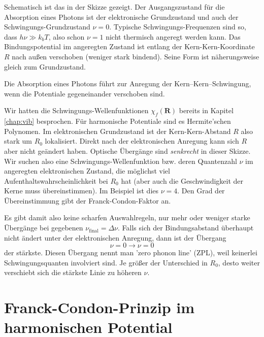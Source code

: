 Schematisch ist das in der Skizze gezeigt. Der Ausgangszustand für die Absorption eines Photons ist der elektronische Grundzustand und auch der Schwingungs-Grundzustand $\nu = 0$. Typische Schwingungs-Frequenzen sind so, dass $h \nu \gg k_b T$, also schon $\nu =1$ nicht thermisch angeregt werden kann. Das Bindungspotential im angeregten Zustand ist entlang der Kern-Kern-Koordinate $R$ nach außen verschoben (weniger stark bindend). Seine Form ist näherungsweise gleich zum Grundzustand. 

\begin{marginfigure}
\caption{Die Absorption eines Photons führt zur Anregung der Kern--Kern--Schwingung, wenn die Potentiale gegeneinander verschoben sind.}
\end{marginfigure}

Wir hatten die Schwingungs-Wellenfunktionen $\chi_f(\mathbf{R})$ bereits in Kapitel \ref{chap:vib} besprochen. Für harmonische Potentiale sind es Hermite'schen Polynomen. Im elektronischen Grundzustand ist der Kern-Kern-Abstand $R$ also stark um $R_0$ lokalisiert. Direkt nach der elektronischen Anregung kann sich $R$ aber nicht geändert haben. Optische Übergänge sind \emph{senkrecht} in dieser Skizze. Wir suchen also eine Schwingungs-Wellenfunktion bzw. deren Quantenzahl $\nu$ im angeregten elektronischen Zustand, die möglichst viel Aufenthaltswahrscheinlichkeit bei $R_0$ hat (aber auch die Geschwindigkeit der Kerne muss übereinstimmen). Im Beispiel ist dies $\nu = 4$. Den Grad der Übereinstimmung gibt der Franck-Condon-Faktor an.

Es gibt damit also keine scharfen Auswahlregeln, nur mehr oder weniger starke Übergänge bei gegebenen $\nu_\text{final}  = \Delta \nu$. Falls sich der Bindungsabstand überhaupt nicht ändert unter der elektronischen Anregung, dann ist der Übergang
\begin{equation}
 \nu = 0 \rightarrow \nu = 0
\end{equation}
der stärkste. Diesen Übergang nennt man 'zero phonon line' (ZPL), weil keinerlei Schwingungsquanten involviert sind. Je größer der Unterschied in $R_0$, desto weiter verschiebt sich die stärkste Linie zu höheren $\nu$. 



\section{Franck-Condon-Prinzip im harmonischen Potential}

